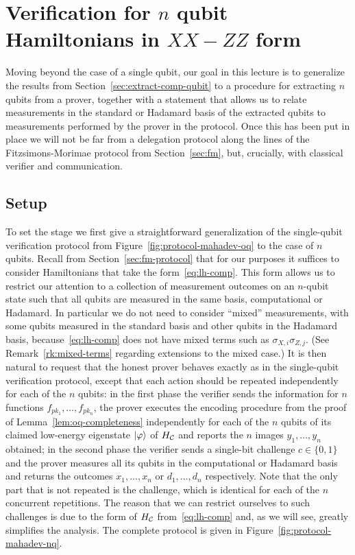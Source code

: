 \chapter{Verification for $n$ qubit Hamiltonians in $XX-ZZ$ form}
\label{chap:nqubit}

Moving beyond the case of a single qubit, our goal in this lecture is to generalize the results from Section~\ref{sec:extract-comp-qubit} to a procedure for extracting $n$ qubits from a prover, together with a statement that allows us to relate measurements in the standard or Hadamard basis of the extracted qubits to measurements performed by the prover in the protocol. Once this has been put in place we will not be far from a delegation protocol along the lines of the Fitzsimons-Morimae protocol from Section~\ref{sec:fm}, but, crucially, with classical verifier and communication. 

\section{Setup}

To set the stage we first give a straightforward generalization of the single-qubit verification protocol from Figure~\ref{fig:protocol-mahadev-oq} to the case of $n$ qubits. Recall from Section~\ref{sec:fm-protocol} that for our purposes it suffices to consider Hamiltonians that take the form~\eqref{eq:lh-comp}. This form allows us to restrict our attention to a collection of measurement outcomes on an $n$-qubit state such that all qubits are measured in the same basis, computational or Hadamard. In particular we do not need to consider ``mixed'' measurements, with some qubits measured in the standard basis and other qubits in the Hadamard basis, because~\eqref{eq:lh-comp} does not have mixed terms such as $\sigma_{X,i}\sigma_{Z,j}$. (See Remark~\ref{rk:mixed-terms} regarding extensions to the mixed case.) It is then natural to request that the honest prover behaves exactly as in the single-qubit verification protocol, except that each action should be repeated independently for each of the $n$ qubits: in the first phase the verifier sends the information for $n$ functions $f_{pk_1},\ldots,f_{pk_n}$, the prover executes the encoding procedure from the proof of Lemma~\ref{lem:oq-completeness} independently for each of the $n$ qubits of its claimed low-energy eigenstate $|\varphi\rangle$ of $H_{\mathcal{C}}$ and reports the $n$ images $y_1,\ldots,y_n$ obtained; in the second phase the verifier sends a single-bit challenge $c\in\{0,1\}$ and the prover measures all its qubits in the computational or Hadamard basis and returns the outcomes $x_1,\ldots,x_n$ or $d_1,\ldots,d_n$ respectively. Note that the only part that is not repeated is the challenge, which is identical for each of the $n$ concurrent repetitions. The reason that we can restrict ourselves to such challenges is due to the form of $H_{\mathcal{C}}$ from~\eqref{eq:lh-comp} and, as we will see, greatly simplifies the analysis. The complete  protocol is given in Figure~\ref{fig:protocol-mahadev-nq}.


